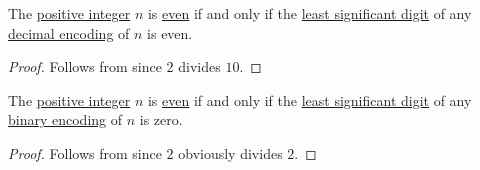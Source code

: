 \begin{corollary}\label{thm:nonnegative_integer_decimal_expansion_parity}
  The \hyperref[def:integers]{positive integer} \( n \) is \hyperref[def:integer_parity]{even} if and only if the \hyperref[def:endianness]{least significant digit} of any \hyperref[def:fixed_width_nonnegative_integer_encoding]{decimal encoding} of \( n \) is even.
\end{corollary}
\begin{proof}
  Follows from  since \( 2 \) divides \( 10 \).
\end{proof}

\begin{corollary}\label{thm:nonnegative_integer_binary_expansion_parity}
  The \hyperref[def:integers]{positive integer} \( n \) is \hyperref[def:integer_parity]{even} if and only if the \hyperref[def:endianness]{least significant digit} of any \hyperref[def:fixed_width_nonnegative_integer_encoding]{binary encoding} of \( n \) is zero.
\end{corollary}
\begin{proof}
  Follows from  since \( 2 \) obviously divides \( 2 \).
\end{proof}

